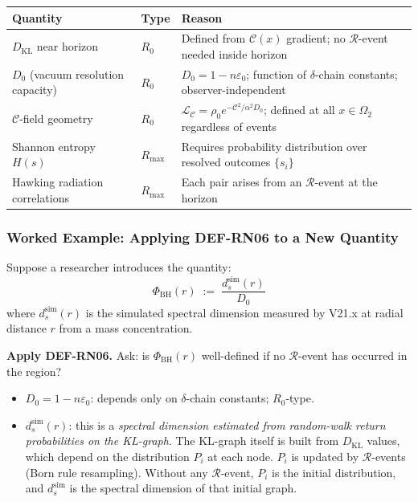 \documentclass[12pt, a4paper]{article}
\begin{document}
\begin{derivedbox}[title={Application of DEF-RN06 to the three
disputed passages}]
\begin{center}
{\small
\renewcommand{\arraystretch}{1.35}
\begin{tabular}{p{4.8cm} p{2.0cm} p{5.5cm}}
\toprule
\textbf{Quantity} & \textbf{Type} & \textbf{Reason}\\
\midrule
$D_{\mathrm{KL}}$ near horizon &
  $R_0$ &
  Defined from $\mathcal{C}(x)$ gradient; no $\mathcal{R}$-event
  needed inside horizon\\
$D_0$ (vacuum resolution capacity) &
  $R_0$ &
  $D_0 = 1 - n\varepsilon_0$; function of $\delta$-chain
  constants; observer-independent\\
$\mathcal{C}$-field geometry &
  $R_0$ &
  $\mathcal{L}_{\mathcal{C}} = \rho_0 e^{-\mathcal{C}^2/\alpha^2 D_0}$;
  defined at all $x \in \Omega_2$ regardless of events\\
Shannon entropy $H(s)$ &
  $R_{\max}$ &
  Requires probability distribution over resolved outcomes
  $\{s_i\}$\\
Hawking radiation correlations &
  $R_{\max}$ &
  Each pair arises from an $\mathcal{R}$-event at the horizon\\
\bottomrule
\end{tabular}
}
\end{center}
\end{derivedbox}

\subsubsection{Worked Example: Applying DEF-RN06 to a New Quantity}
\label{sec:worked}

Suppose a researcher introduces the quantity:
\[
  \Phi_{\mathrm{BH}}(r) \;:=\; \frac{d_s^{\mathrm{sim}}(r)}{D_0}
\]
where $d_s^{\mathrm{sim}}(r)$ is the simulated spectral dimension
measured by V21.x at radial distance $r$ from a mass concentration.

\textbf{Apply DEF-RN06.} Ask: is $\Phi_{\mathrm{BH}}(r)$
well-defined if no $\mathcal{R}$-event has occurred in the region?

\begin{itemize}[leftmargin=*]
\item $D_0 = 1 - n\varepsilon_0$: depends only on $\delta$-chain
  constants; $R_0$-type. \checkmark
\item $d_s^{\mathrm{sim}}(r)$: this is a \emph{spectral dimension
  estimated from random-walk return probabilities on the KL-graph}.
  The KL-graph itself is built from $D_{\mathrm{KL}}$ values, which
  depend on the distribution $P_i$ at each node. $P_i$ is updated
  by $\mathcal{R}$-events (Born rule resampling). Without any
  $\mathcal{R}$-event, $P_i$ is the initial distribution, and
  $d_s^{\mathrm{sim}}$ is the spectral dimension of that initial
  graph.
\end{itemize}
\end{document}
